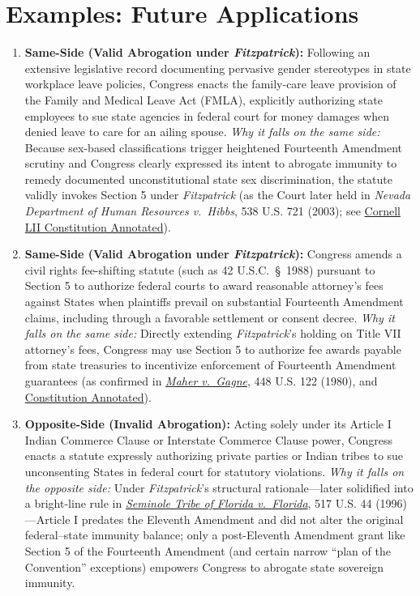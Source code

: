\documentclass[12pt]{article}
\begin{document}
\section{Examples: Future Applications}

\begin{enumerate}
\item \textbf{Same-Side (Valid Abrogation under \textit{Fitzpatrick}):} Following an extensive legislative record documenting pervasive gender stereotypes in state workplace leave policies, Congress enacts the family-care leave provision of the Family and Medical Leave Act (FMLA), explicitly authorizing state employees to sue state agencies in federal court for money damages when denied leave to care for an ailing spouse. \textit{Why it falls on the same side:} Because sex-based classifications trigger heightened Fourteenth Amendment scrutiny and Congress clearly expressed its intent to abrogate immunity to remedy documented unconstitutional state sex discrimination, the statute validly invokes Section 5 under \textit{Fitzpatrick} (as the Court later held in \textit{Nevada Department of Human Resources v.\ Hibbs}, 538 U.S. 721 (2003); see \href{https://www.law.cornell.edu/constitution-conan/amendment-14/section-5/what-may-congress-do-to-enforce-the-fourteenth-amendment-modern-doctrine}{Cornell LII Constitution Annotated}).

\item \textbf{Same-Side (Valid Abrogation under \textit{Fitzpatrick}):} Congress amends a civil rights fee-shifting statute (such as 42 U.S.C.\ \S~1988) pursuant to Section 5 to authorize federal courts to award reasonable attorney's fees against States when plaintiffs prevail on substantial Fourteenth Amendment claims, including through a favorable settlement or consent decree. \textit{Why it falls on the same side:} Directly extending \textit{Fitzpatrick}'s holding on Title VII attorney's fees, Congress may use Section 5 to authorize fee awards payable from state treasuries to incentivize enforcement of Fourteenth Amendment guarantees (as confirmed in \href{https://supreme.justia.com/cases/federal/us/448/122/}{\textit{Maher v.\ Gagne}}, 448 U.S. 122 (1980), and \href{https://constitution.congress.gov/browse/essay/amdt11-6-2/ALDE_00013683/}{Constitution Annotated}).

\item \textbf{Opposite-Side (Invalid Abrogation):} Acting solely under its Article I Indian Commerce Clause or Interstate Commerce Clause power, Congress enacts a statute expressly authorizing private parties or Indian tribes to sue unconsenting States in federal court for statutory violations. \textit{Why it falls on the opposite side:} Under \textit{Fitzpatrick}'s structural rationale---later solidified into a bright-line rule in \href{https://supreme.justia.com/cases/federal/us/517/44/}{\textit{Seminole Tribe of Florida v.\ Florida}}, 517 U.S. 44 (1996)---Article I predates the Eleventh Amendment and did not alter the original federal--state immunity balance; only a post-Eleventh Amendment grant like Section 5 of the Fourteenth Amendment (and certain narrow ``plan of the Convention'' exceptions) empowers Congress to abrogate state sovereign immunity.


\end{enumerate}
\end{document}
